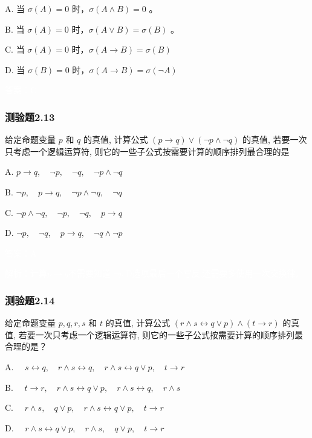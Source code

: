 \documentclass[UTF8, heading=true]{ctexart}
\begin{document}
A. 当 $\sigma(A)=0$ 时，$\sigma(A \wedge B)=0$ 。

B. 当 $\sigma(A)=0$ 时，$\sigma(A \vee B)=\sigma(B)$ 。

C. 当 $\sigma(A)=0$ 时，$\sigma(A \rightarrow B)=\sigma(B)$

D.  当 $\sigma(B)=0$ 时，$\sigma(A \rightarrow B)=\sigma(\neg A)$

\textcolor{white}{答案：C}

\subsubsection{测验题2.13}

给定命题变量 $p$ 和 $q$ 的真值, 计算公式 $(p \rightarrow q) \vee(\neg p \wedge \neg q)$ 的真值, 若要一次只考虑一个逻辑运算符, 则它的一些子公式按需要计算的顺序排列最合理的是 $\qquad$

A. $
p \rightarrow q, \quad \neg p, \quad \neg q, \quad \neg p \wedge \neg q
$

B. $
\neg p, \quad p \rightarrow q, \quad \neg p \wedge \neg q, \quad \neg q
$

C. $
\neg p \wedge \neg q, \quad \neg p, \quad \neg q, \quad p \rightarrow q
$

D. $
\neg p, \quad \neg q, \quad p \rightarrow q, \quad \neg q \wedge \neg p
$

\textcolor{white}{答案：A}

\textcolor{white}{解析：计算$p \rightarrow q$不需要知道 $\neg p$,D选项最后一个写反,还需要多使用一次交换律。}


\subsubsection{测验题2.14}

给定命题变量 $p, q, r, s$ 和 $t$ 的真值, 计算公式 $(r \wedge s \leftrightarrow q \vee p) \wedge(t \rightarrow r)$ 的真值, 若要一次只考虑一个逻辑运算符, 则它的一些子公式按需要计算的顺序排列最合理的是？

A. $\quad s \leftrightarrow q, \quad r \wedge s \leftrightarrow q, \quad r \wedge s \leftrightarrow q \vee p, \quad t \rightarrow r$

B. $\quad t \rightarrow r, \quad r \wedge s \leftrightarrow q \vee p, \quad r \wedge s \leftrightarrow q, \quad r \wedge s$

C. $\quad r \wedge s, \quad q \vee p, \quad r \wedge s \leftrightarrow q \vee p, \quad t \rightarrow r$

D. $\quad r \wedge s \leftrightarrow q \vee p, \quad r \wedge s, \quad q \vee p, \quad t \rightarrow r$
\end{document}
